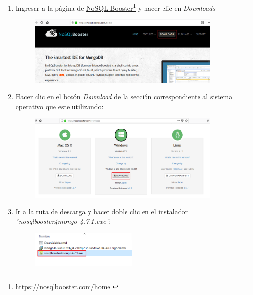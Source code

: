 \documentclass[a4paper,11pt]{paper}
\begin{document}
\begin{enumerate}
\def\labelenumi{\arabic{enumi}.}
\item
  Ingresar a la página de \href{https://nosqlbooster.com/home}{NoSQL
  Booster}\footnote{https://nosqlbooster.com/home \cite{booster}} y hacer clic en \emph{Downloads}

  \begin{figure}[!h]
  \centering
  \includegraphics[width=0.9\textwidth]{imgs/instalacion/BoosterDownload.png}
  \end{figure}
\item
  Hacer clic en el botón \emph{Download} de la sección correspondiente
  al sistema operativo que este utilizando:

  \begin{figure}[!h]
  \centering
  \includegraphics[width=0.9\textwidth]{imgs/instalacion/BoosterDownload2.png}
  \end{figure}
\item
  Ir a la ruta de descarga y hacer doble clic en el instalador
  \emph{``nosqlbooster4mongo-4.7.1.exe''}:

  \begin{figure}[!h]
  \centering
  \includegraphics[width=0.5\textwidth]{imgs/instalacion/BoosterInstall.png}
  \end{figure}


\end{enumerate}
\end{document}
